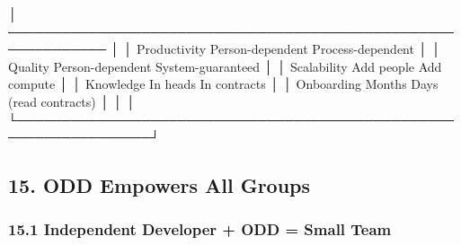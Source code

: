 \documentclass[
]{article}
\newenvironment{Shaded}{}{}
\newcommand{\NormalTok}[1]{#1}
\begin{document}
\begin{Shaded}
\begin{Highlighting}[]
\NormalTok{│  ─────────────────────────────────────────────────────────────  │}
\NormalTok{│  Productivity     Person{-}dependent  Process{-}dependent          │}
\NormalTok{│  Quality          Person{-}dependent  System{-}guaranteed          │}
\NormalTok{│  Scalability      Add people        Add compute                │}
\NormalTok{│  Knowledge        In heads          In contracts               │}
\NormalTok{│  Onboarding       Months            Days (read contracts)      │}
\NormalTok{│                                                                  │}
\NormalTok{└─────────────────────────────────────────────────────────────────┘}
\end{Highlighting}
\end{Shaded}

\hypertarget{15-odd-empowers-all-groups}{%
\subsection{15. ODD Empowers All
Groups}\label{15-odd-empowers-all-groups}}

\hypertarget{151-independent-developer-+-odd-=-small-team}{%
\subsubsection{15.1 Independent Developer + ODD = Small
Team}\label{151-independent-developer-+-odd-=-small-team}}
\end{document}
